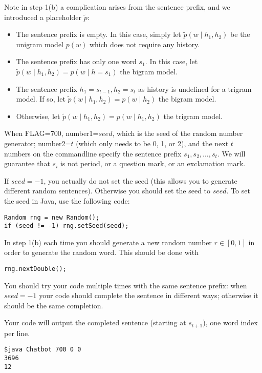 \documentclass{article}
\begin{document}
\begin{itemize}
Note in step 1(b) a complication arises from the sentence prefix, and we introduced a placeholder $\tilde p$:
\begin{itemize}
\item The sentence prefix is empty.  In this case, simply let $\tilde  p(w \mid h_1, h_2)$ be the unigram model $p(w)$ which does not require any history.
\item The sentence prefix has only one word $s_1$.  In this case, let $\tilde  p(w \mid h_1, h_2) = p(w \mid h=s_1)$ the bigram model.
\item The sentence prefix $h_1 = s_{t-1}, h_2 =s_t$ as history is undefined for a trigram model.  If so, let $\tilde  p(w \mid h_1, h_2) = p(w \mid h_2)$ the bigram model.
\item Otherwise, let $\tilde  p(w \mid h_1, h_2) = p(w \mid h_1, h_2)$ the trigram model.

\end{itemize}


When FLAG=700, number1=$seed$, which is the seed of the random number generator; number2=$t$ (which only needs to be 0, 1, or 2), and the next $t$ numbers on the commandline specify the sentence prefix $s_1, s_2, \ldots, s_t$. We will guarantee that $s_i$ is not period, or a question mark, or an exclamation mark.

If $seed=-1$, you actually do not set the seed (this allows you to generate different random sentences).  
Otherwise you should set the seed to $seed$. To set the seed in Java, use the following code:
\begin{verbatim}
Random rng = new Random();
if (seed != -1) rng.setSeed(seed);
\end{verbatim}

In step 1(b) each time you should generate a new random number $r \in [0,1]$ in order to generate the random word.
This should be done with 
\begin{verbatim}
rng.nextDouble();
\end{verbatim}
You should try your code multiple times with the same sentence prefix: when $seed=-1$ your code should complete the sentence in different ways; otherwise it should be the same completion.

Your code will output the completed sentence (starting at $s_{t+1}$), one word index per line.
\begin{verbatim}
$java Chatbot 700 0 0
3696
12


\end{verbatim}
\end{itemize}
\end{document}
